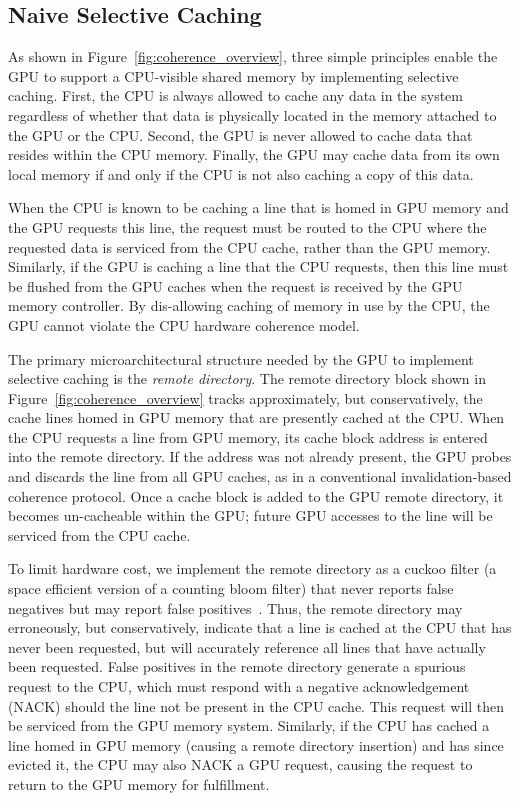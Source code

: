 \subsection{Naive Selective Caching}
\label{naiveselectivecaching}

As shown in Figure~\ref{fig:coherence_overview},
three simple principles enable the GPU to support a CPU-visible shared memory
by implementing selective caching. First, the CPU is always allowed to cache any data in the system regardless 
of whether that data is physically located in the memory attached to the GPU or the CPU\@. 
Second, the GPU is never allowed to cache data that resides within the 
CPU memory.  Finally, the GPU may cache data from its 
own local memory if and only if the CPU is not also caching a copy of this 
data.

When the CPU is known to be caching a line that is homed in GPU memory and the GPU requests
this line, the request must be routed to the CPU where the requested data is serviced 
from the CPU cache, rather than the GPU memory. Similarly, if the GPU is caching a 
line that the CPU requests, then this line must be flushed from the GPU caches when the 
request is received by the GPU memory controller. By dis-allowing caching 
of memory in use by the CPU, the GPU cannot violate the CPU hardware coherence model.

The primary microarchitectural structure needed by the GPU to implement
selective caching is the \emph{remote directory}. The remote directory block
shown in Figure~\ref{fig:coherence_overview} tracks approximately, but conservatively,
the cache lines homed in GPU  memory that are presently cached at the CPU.
When the CPU requests a line from GPU memory,  its cache block address is  
entered into the remote directory.  If the address was not already present, the GPU
probes and discards the line from all GPU caches, as in a conventional invalidation-based 
coherence protocol.  Once a cache block is added to the GPU remote
directory, it becomes un-cacheable within the GPU; future GPU accesses to the line
will be serviced from the CPU cache.

To limit hardware cost, we implement the remote directory as a cuckoo filter 
(a space efficient version of a counting bloom filter) that never reports
false negatives but may report false positives~\cite{fan2014,bonomi2006}. Thus, the remote directory may erroneously, but conservatively,
indicate that a line is cached at the CPU that has never been requested, but will accurately reference
all lines that have actually been requested.  False positives in the remote directory generate
a spurious request to the CPU, which must respond with a negative acknowledgement (NACK) should the line
not be present in the CPU cache.  This request will then be serviced from the GPU memory
system.  Similarly, if the CPU has cached a line homed in GPU memory (causing a remote directory insertion)
and has since evicted it, the CPU may also NACK a GPU request, causing the request to return to the GPU memory
for fulfillment.

